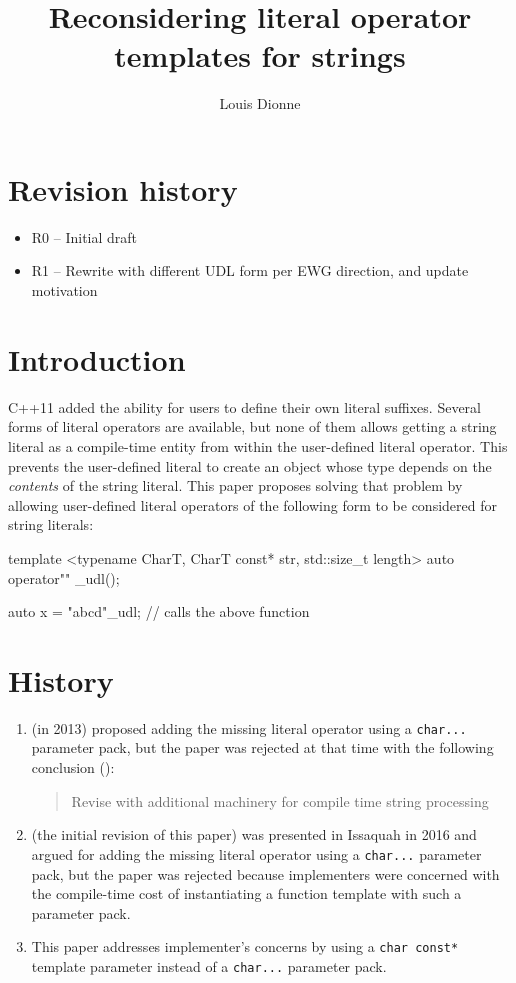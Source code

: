 \documentclass{wg21}
\title{Reconsidering literal operator templates for strings}
\author{Louis Dionne}{ldionne.2@gmail.com}
\newcommand{\cc}[1]{\texttt{#1}}
\begin{document}
\maketitle


\section{Revision history}
\begin{itemize}
  \item R0 -- Initial draft
  \item R1 -- Rewrite with different UDL form per EWG direction, and update motivation
\end{itemize}


\section{Introduction}
C++11 added the ability for users to define their own literal suffixes.
Several forms of literal operators are available, but none of them allows
getting a string literal as a compile-time entity from within the user-defined
literal operator. This prevents the user-defined literal to create an object
whose type depends on the \emph{contents} of the string literal. This paper
proposes solving that problem by allowing user-defined literal operators of
the following form to be considered for string literals:

\begin{cpp}
template <typename CharT, CharT const* str, std::size_t length>
auto operator"" _udl();

auto x = "abcd"_udl; // calls the above function
\end{cpp}


\section{History}
\begin{enumerate}
  \item \cite{N3599} (in 2013) proposed adding the missing literal operator
        using a \cc{char...} parameter pack, but the paper was rejected at
        that time with the following conclusion (\cite{CWG66}):
        \begin{quote}
          Revise with additional machinery for compile time string processing
        \end{quote}
  \item \cite{P0424R0} (the initial revision of this paper) was presented in
        Issaquah in 2016 and argued for adding the missing literal operator
        using a \cc{char...} parameter pack, but the paper was rejected
        because implementers were concerned with the compile-time cost of
        instantiating a function template with such a parameter pack.
  \item This paper addresses implementer's concerns by using a \cc{char const*}
        template parameter instead of a \cc{char...} parameter pack.
\end{enumerate}
\end{document}
